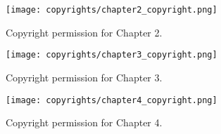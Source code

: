 \makeatletter
\renewcommand \thefigure{A\@arabic\c@figure}
\makeatother

\setcounter{figure}{0}  

\begin{figure}[ht]
  \centering
\texttt{[image: copyrights/chapter2\_copyright.png]}
  \caption[Copyright permission for Chapter 2]{Copyright permission for Chapter 2.}
    \label{fig:copyright_chapter_2}  
\end{figure}

\clearpage

\begin{figure}[ht]
  \centering
\texttt{[image: copyrights/chapter3\_copyright.png]}
  \caption[Copyright permission for Chapter 3]{Copyright permission for Chapter 3.}
    \label{fig:copyright_chapter_3}  
\end{figure}

\clearpage

\begin{figure}[ht]
  \centering
\texttt{[image: copyrights/chapter4\_copyright.png]}
  \caption[Copyright permission for Chapter 4]{Copyright permission for Chapter 4.}
    \label{fig:copyright_chapter_4}  
\end{figure}